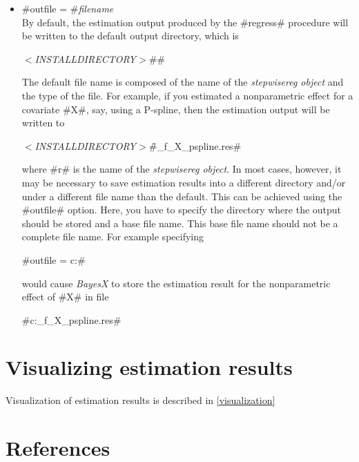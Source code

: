 \begin{itemize}
\item #outfile = #{\em filename} \\
By default, the estimation output produced by the #regress#
procedure will be written to the default output directory, which
is

{\em$<$INSTALLDIRECTORY$>$}#\output#

The default file name is composed of the name of the {\em stepwisereg
object} and the type of the file. For example, if you estimated a
nonparametric effect for a covariate #X#, say, using a P-spline,
then the estimation output will be written to

{\em$<$INSTALLDIRECTORY$>$}#\output\r_f_X_pspline.res#

where #r# is the name of the {\em stepwisereg object}. In most cases,
however, it may be necessary to save estimation results into a
different directory and/or under a different file name than the
default. This can be achieved using the #outfile# option. Here, you
have to specify the directory where the output should be stored and
a base file name. This base file name should not be a complete file
name. For example specifying

#outfile = c:\data{}#

would cause {\em BayesX} to store the estimation result for the
nonparametric effect of #X# in file

#c:\data{}_f_X_pspline.res#
\end{itemize}



\section{Visualizing estimation results}

Visualization of estimation results is described in
\autoref{visualization}

\section{References}
\label{stepwiseregreferences}

